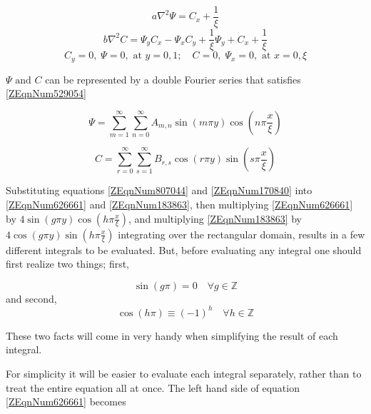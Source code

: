\documentclass{article}
\newcommand{\spbox}[1]{ \text{ #1 }} %
\newcommand{\csp}{, \;} %
\begin{document}
\begin{equation} \label{ZEqnNum626661} 
    a\nabla ^{2} \Psi =C_{x} +\frac{1}{\xi } 
\end{equation} 
\begin{equation} \label{ZEqnNum183863} 
    b\nabla ^{2} C=\Psi _{y} C_{x} -\Psi _{x} C_{y} +\frac{1}{\xi } \Psi _{y} +C_{x} +\frac{1}{\xi } 
\end{equation} 
\begin{equation} \label{ZEqnNum529054} 
    C_{y} =0 \csp \Psi =0, \spbox{at} y = 0,1; \quad C = 0\csp \Psi
    _{x} = 0, \spbox{at}x=0,\xi
\end{equation}

$\Psi\spbox{and} C$ can be represented by a double Fourier series that satisfies
\eqref{ZEqnNum529054} \cite{Henry60}

\begin{equation} \label{ZEqnNum807044} \Psi =\sum _{m=1}^{\infty } \sum
_{n=0}^{\infty }A_{m,n} \sin \left(m\pi y\right)\cos \left(n\pi \frac{x}{\xi }
\right) \end{equation}

\begin{equation} \label{ZEqnNum170840} C=\sum _{r=0}^{\infty } \sum
_{s=1}^{\infty }B_{r,s} \cos \left(r\pi y\right)\sin \left(s\pi \frac{x}{\xi }
\right) \end{equation}

Substituting equations \eqref{ZEqnNum807044} and \eqref{ZEqnNum170840} into
\eqref{ZEqnNum626661} and \eqref{ZEqnNum183863}, then multiplying
\eqref{ZEqnNum626661} by $4\sin \left(g\pi y\right)\cos \left(h\pi \frac{x}{\xi
} \right)$, and multiplying \eqref{ZEqnNum183863} by $4\cos \left(g\pi
y\right)\sin \left(h\pi \frac{x}{\xi } \right)$ integrating over the rectangular
domain, results in a few different integrals to be evaluated. But, before
evaluating any integral one should first realize two things; first,

\begin{equation} \label{3.7)} \sin (g\pi )=0 \quad \forall g\in {\mathbb Z}
\end{equation}
and second, 
\begin{equation} \label{ZEqnNum821421} \cos \left(h\pi \right)\equiv
\left(-1\right)^{h} \quad \forall h\in {\mathbb Z} \end{equation}

These two facts will come in very handy when simplifying the result of each
integral. 

For simplicity it will be easier to evaluate each integral separately, rather
than to treat the entire equation all at once. The left hand side of equation
\eqref{ZEqnNum626661} becomes
\end{document}
